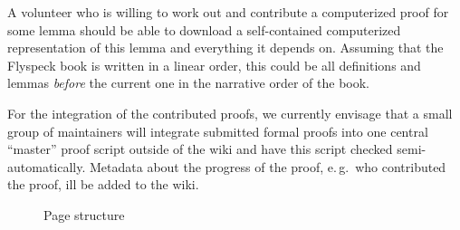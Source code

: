 A volunteer who is willing to work out and contribute a computerized
proof for some lemma should be able to download a self-contained
computerized representation of this lemma and everything it depends
on.  Assuming that the Flyspeck book is written in a linear order, this could be all
definitions and lemmas \emph{before} the current one in the narrative order of the
book.  


For the integration of the contributed proofs, we currently envisage
that a small group of maintainers will integrate submitted formal
proofs into one central ``master'' proof script outside of the wiki
and have this script checked semi-automatically.  Metadata about the
progress of the proof, e.\,g.\ who contributed the proof, ill be added
to the wiki.  


\newcommand{\wikipage}[5]{\node[draw,text width=5cm,font=\tiny\sffamily] (#1) at #2 {
    {\footnotesize\bfseries #3}\\
    #4
    ~\\[1em]
    [Download Isabelle representation]\\
    #5
  };}
\begin{figure}
  \centering
  \caption{Page structure}
  \label{fig:pagestructure}
\end{figure}

